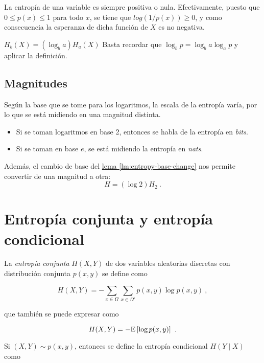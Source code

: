 \lemmab
La entropía de una variable es siempre positiva o nula. \proofb
Efectivamente, puesto que \(0\leq p(x)\leq 1\) para todo \(x\), se tiene
que \(log(1/p(x))\geq 0\), y como consecuencia la esperanza de dicha
función de \(X\) es no negativa. \proofe
\lemmae

\lemmab
\(H_b(X)=\left(\log_b a\right)H_a(X)\) \label{lm:entropy-base-change}
\proofb
Basta recordar que \(\log_{b}p=\log_{b}a\log_a p\) y aplicar la
definición. \proofe
\lemmae

\subsection{Magnitudes}\label{magnitudes}

Según la base que se tome para los logaritmos, la escala de la entropía
varía, por lo que se está midiendo en una magnitud distinta.

\begin{itemize}
\tightlist
\item
  Si se toman logaritmos en base 2, entonces se habla de la entropía en
  \emph{bits}.
\item
  Si se toman en base \(e\), se está midiendo la entropía en
  \emph{nats}.
\end{itemize}

Además, el cambio de base del
\hyperref[lm:entropy-base-change]{lema \ref*{lm:entropy-base-change}}
nos permite convertir de una magnitud a otra: \[H=(\log 2) H_2~.\]

\section{Entropía conjunta y entropía
condicional}\label{entropuxeda-conjunta-y-entropuxeda-condicional}

La \emph{entropía conjunta} \(H(X,Y)\) de dos variables aleatorias
discretas con distribución conjunta \(p(x,y)\) se define como

\begin{equation}H(X,Y)=-\sum_{x\in\Omega}\sum_{x\in\Omega'}p(x,y)\log p(x,y)~,\end{equation}

que también se puede expresar como

\begin{equation}H(X,Y)=-\mathrm{E}\left[\log p(x,y)\right]~.\end{equation}


Si \((X,Y)\sim p(x,y)\), entonces se define la entropía condicional
\(H(Y\mid X)\) como


